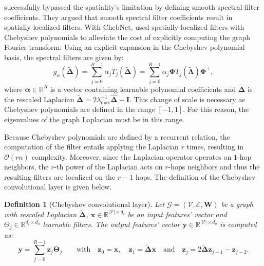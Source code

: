 \documentclass{article}
\newtheorem{definition}{Definition}[section]
\begin{document}
\citet{henaff2015deep} successfully bypassed the spatiality's limitation by defining smooth spectral filter coefficients. They argued that smooth spectral filter coefficients result in spatially-localized filters. With ChebNet, \citet{defferrard2016chebnet} used spatially-localized filters with Chebyshev polynomials to alleviate the cost of explicitly computing the graph Fourier transform. Using an explicit expansion in the Chebyshev polynomial basis, the spectral filters are given by:
\begin{equation} \label{eq:Chebyshev_filters}
g_{\alpha}(\boldsymbol{\tilde{\Delta}}) = \sum_{j=0}^{R-1} \alpha_j T_j (\boldsymbol{\tilde{\Delta}}) = \sum_{j=0}^{R-1} \alpha_j \boldsymbol{\Phi} T_j (\boldsymbol{\tilde{\Lambda}}) \boldsymbol{\Phi}^\top,
\end{equation}
where $\boldsymbol{\alpha} \in \mathbb{R}^R$ is a vector containing learnable polynomial coefficients and $\boldsymbol{\tilde{\Delta}}$ is the rescaled Laplacian $\boldsymbol{\tilde{\Delta}} = 2\lambda_{\max}^{-1}\boldsymbol{\hat{\Delta}} - \boldsymbol{I}$. This change of scale is necessary as Chebyshev polynomials are defined in the range $[-1,1]$. For this reason, the eigenvalues of the graph Laplacian must be in this range.

Because Chebyshev polynomials are defined by a recurrent relation, the computation of the filter entails applying the Laplacian $r$ times, resulting in $\mathcal{O}(rn)$ complexity. Moreover, since the Laplacian operator operates on $1$-hop neighbors, the $r$-th power of the Laplacian acts on $r$-hops neighbors and thus the resulting filters are localized on the $r-1$ hops. The definition of the Chebyshev convolutional layer is given below.

\begin{definition}[Chebyshev convolutional layer] \label{def:cheb_conv}
Let $\mathcal{G} = (\mathcal{V}, \mathcal{E}, \boldsymbol{W})$ be a graph with rescaled Laplacian $\boldsymbol{\tilde{\Delta}}$, $\boldsymbol{x} \in \mathbb{R}^{|\mathcal{V}| \times d_i}$  be an input features' vector and $\Theta_j \in \mathbb{R}^{d_i \times d_o}$ learnable filters. The output features' vector $\boldsymbol{y} \in \mathbb{R}^{|\mathcal{V}| \times d_o}$ is computed as:
\begin{equation}
\boldsymbol{y} = \sum_{j=0}^{R-1} \boldsymbol{z}_j \boldsymbol{\Theta}_j \qquad \text{with} \quad \boldsymbol{z}_0 = \boldsymbol{x}, \quad \boldsymbol{z}_1 = \boldsymbol{\tilde{\Delta} x} \quad  \text{and} \quad \boldsymbol{z}_j = 2 \boldsymbol{\tilde{\Delta} z}_{j-1} - \boldsymbol{z}_{j-2}.
\end{equation}
\end{definition}
\end{document}
